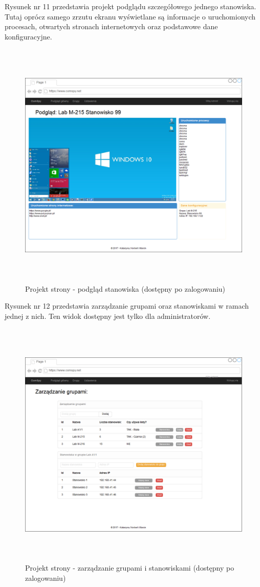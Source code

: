 \newpage
Rysunek nr 11 przedstawia projekt podglądu szczegółowego jednego stanowiska. Tutaj oprócz samego zrzutu ekranu wyświetlane są informacje o uruchomionych procesach, otwartych stronach internetowych oraz podstawowe dane konfiguracyjne.
\begin{figure} [!ht]
    \centering
    \includegraphics[height=12cm,width=15cm]{interfejs_podglad_stanowiska}
    \caption{Projekt strony - podgląd stanowiska (dostępny po zalogowaniu)}
    \label{fig:my_label}
\end{figure}


\newpage
Rysunek nr 12 przedstawia zarządzanie grupami oraz stanowiskami w ramach jednej z nich. Ten widok dostępny jest tylko dla administratorów.
\begin{figure} [!ht]
    \centering
    \includegraphics[height=12cm,width=15cm]{interfejs_grupy}
    \caption{Projekt strony - zarządzanie grupami i stanowiskami (dostępny po zalogowaniu)}
    \label{fig:my_label}
\end{figure}


